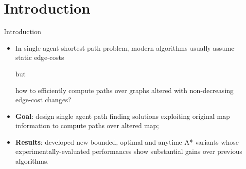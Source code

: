 \section*{Introduction}

\begin{frame}{Introduction}
    \begin{itemize}
        \item In single agent shortest path problem, modern algorithms usually assume static edge-costs
        
        \begin{center}
            but
        \end{center}
        
        how to efficiently compute paths over graphs altered with non-decreasing edge-cost changes?

        \item \textbf{Goal}: design single agent path finding solutions exploiting original map information to compute paths over
            altered map;
        \item \textbf{Results}: developed new bounded, optimal and anytime A* variants whose experimentally-evaluated performances show substantial gains over previous algorithms.
    \end{itemize}
\end{frame}

